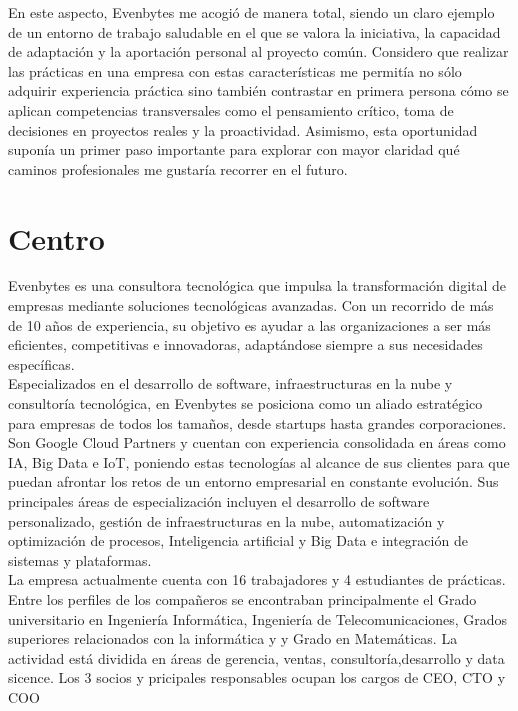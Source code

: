 En este aspecto, Evenbytes me acogió de manera total, siendo un claro ejemplo de un entorno de trabajo saludable en el que se valora la iniciativa, la capacidad de adaptación y la aportación personal al proyecto común. Considero que realizar las prácticas en una empresa con estas características me permitía no sólo adquirir experiencia práctica sino también contrastar en primera persona cómo se aplican competencias transversales como el pensamiento crítico, toma de decisiones en proyectos reales y la proactividad. Asimismo, esta oportunidad suponía un primer paso importante para explorar con mayor claridad qué caminos profesionales me gustaría recorrer en el futuro.
%
%
\section{Centro} \label{centro}
%
%
Evenbytes es una consultora tecnológica que impulsa la transformación digital de empresas mediante soluciones tecnológicas avanzadas. Con un recorrido de más de 10 años de experiencia, su objetivo es ayudar a las organizaciones a ser más eficientes, competitivas e innovadoras, adaptándose siempre a sus necesidades específicas.\\

Especializados en el desarrollo de software, infraestructuras en la nube y consultoría tecnológica, en Evenbytes se posiciona como un aliado estratégico para empresas de todos los tamaños, desde startups hasta grandes corporaciones. Son Google Cloud Partners y cuentan con experiencia consolidada en áreas como IA, Big Data e IoT, poniendo estas tecnologías al alcance de sus clientes para que puedan afrontar los retos de un entorno empresarial en constante evolución. Sus principales áreas de especialización incluyen el desarrollo de software personalizado, gestión de infraestructuras en la nube, automatización y optimización de procesos, Inteligencia artificial y Big Data e integración de sistemas y plataformas.\\

La empresa actualmente cuenta con 16 trabajadores y 4 estudiantes de prácticas. Entre los perfiles de los compañeros se encontraban principalmente el Grado universitario en Ingeniería Informática, Ingeniería de Telecomunicaciones, Grados superiores relacionados con la informática y y Grado en Matemáticas. La actividad está dividida en áreas de gerencia, ventas, consultoría,desarrollo y data sicence. Los 3 socios y pricipales responsables ocupan los cargos de CEO, CTO y COO

